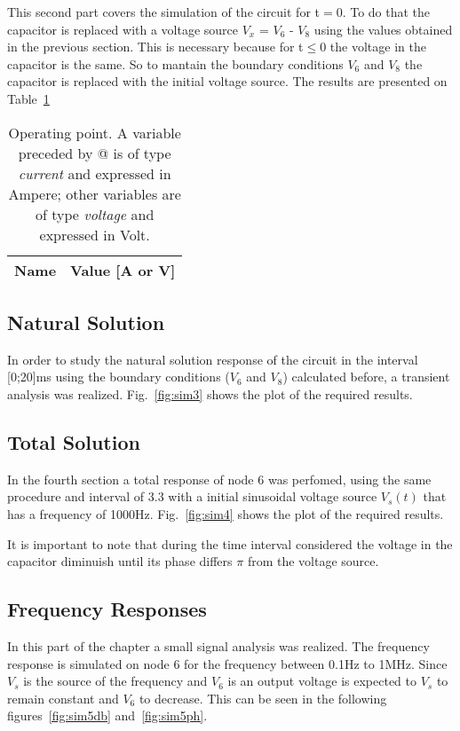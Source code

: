 This second part covers the simulation of the circuit for t$=$0. To do that the capacitor is replaced with a voltage source $V_{x}$ = $V_{6}$ - $V_{8}$ using the values obtained in the previous section. This is necessary because for t$\leq$0 the voltage in the capacitor is the same. So to mantain the boundary conditions $V_{6}$ and $V_{8}$ the capacitor is replaced with the initial voltage source.
The results are presented on Table~\ref{tab:op2}
\pagebreak
\begin{table}[!ht]
  \centering
  \begin{tabular}{|l|r|}
    \hline    
    {\bf Name} & {\bf Value [A or V]} \\ \hline
    
  \end{tabular}
  \caption{Operating point. A variable preceded by @ is of type {\em current}
    and expressed in Ampere; other variables are of type {\it voltage} and expressed in
    Volt.}
  \label{tab:op2}
\end{table}


\subsection{Natural Solution}
In order to study the natural solution response of the circuit in the interval [0;20]ms using the boundary conditions ($V_{6}$ and $V_{8}$) calculated before, a transient analysis was realized. 
Fig.~\ref{fig:sim3} shows the plot of the required results.


\subsection{Total Solution}

In the fourth section a total response of node 6 was perfomed, using the same procedure and interval of 3.3 with a initial sinusoidal voltage source $V_{s}(t)$ that has a frequency of 1000Hz. 
Fig.~\ref{fig:sim4} shows the plot of the required results.


It is important to note that during the time interval considered the voltage in the capacitor diminuish until its phase differs $\pi$ from the voltage source.


\subsection{Frequency Responses}

In this part of the chapter a small signal analysis was realized. The frequency response is simulated on node 6 for the frequency between 0.1Hz to 1MHz. 
Since $V_{s}$ is the source of the frequency and $V_{6}$ is an output voltage is expected to $V_{s}$ to remain constant and $V_{6}$ to decrease. This can be seen in the following figures~\ref{fig:sim5db} and~\ref{fig:sim5ph}.

